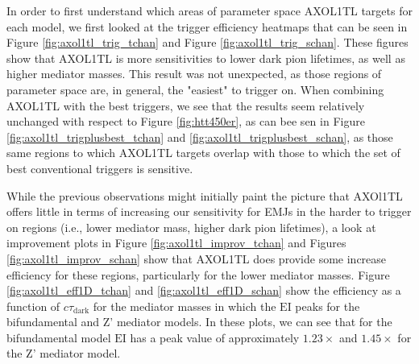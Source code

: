 In order to first understand which areas of parameter space AXOL1TL targets for each model, we first looked at the trigger efficiency heatmaps that can be seen in Figure \ref{fig:axol1tl_trig_tchan} and Figure \ref{fig:axol1tl_trig_schan}. These figures show that AXOL1TL is more sensitivities to lower dark pion lifetimes, as well as higher mediator masses. This result was not unexpected, as those regions of parameter space are, in general, the "easiest" to trigger on. When combining AXOL1TL with the best triggers, we see that the results seem relatively unchanged with respect to Figure \ref{fig:htt450er}, as can bee sen in Figure \ref{fig:axol1tl_trigplusbest_tchan} and \ref{fig:axol1tl_trigplusbest_schan}, as those same regions to which AXOL1TL targets overlap with those to which the set of best conventional triggers is sensitive. 

While the previous observations might initially paint the picture that AXOl1TL offers little in terms of increasing our sensitivity for EMJs in the harder to trigger on regions (i.e., lower mediator mass, higher dark pion lifetimes), a look at improvement plots in Figure \ref{fig:axol1tl_improv_tchan} and Figures \ref{fig:axol1tl_improv_schan} show that AXOL1TL does provide some increase efficiency for these regions, particularly for the lower mediator masses. Figure \ref{fig:axol1tl_eff1D_tchan} and \ref{fig:axol1tl_eff1D_schan} show the efficiency as a function of $c\tau_{\text{dark}}$ for the mediator masses in which the $\text{EI}$ peaks for the bifundamental and Z' mediator models. In these plots, we can see that for the bifundamental model $\text{EI}$ has a peak value of approximately $1.23\times$ and $1.45\times$ for the Z' mediator model. 

